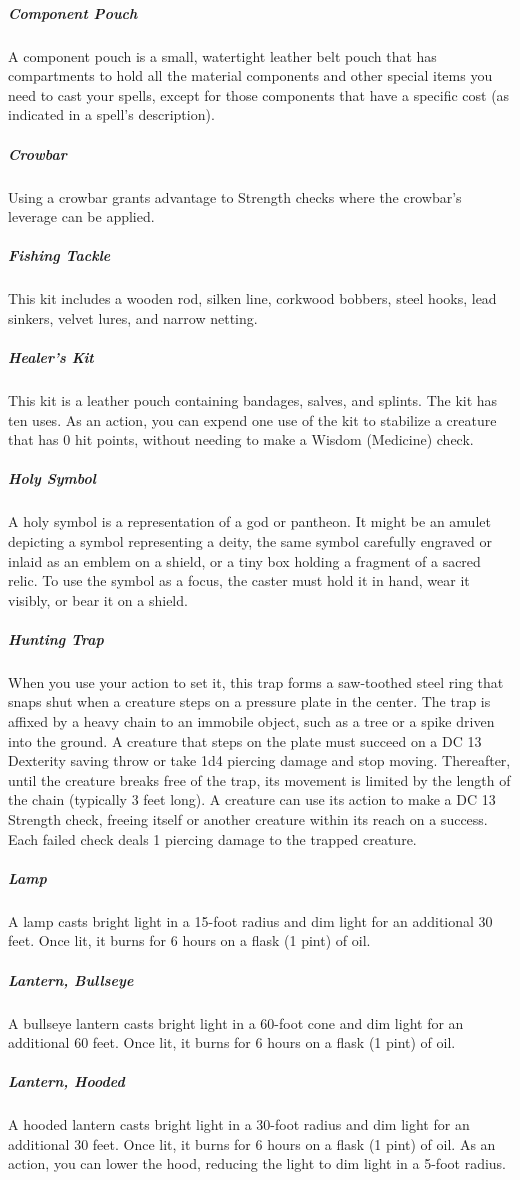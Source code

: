 \subparagraph*{Component Pouch} A component pouch is a small, watertight leather belt pouch that has compartments to hold all the material components and other special items you need to cast your spells, except for those components that have a specific cost (as indicated in a spell's description).
\subparagraph*{Crowbar} Using a crowbar grants advantage to Strength checks where the crowbar's leverage can be applied.

\subparagraph*{Fishing Tackle} This kit includes a wooden rod, silken line, corkwood bobbers, steel hooks, lead sinkers, velvet lures, and narrow netting.
\subparagraph*{Healer's Kit} This kit is a leather pouch containing bandages, salves, and splints. The kit has ten uses. As an action, you can expend one use of the kit to stabilize a creature that has 0 hit points, without needing to make a Wisdom (Medicine) check.

\subparagraph*{Holy Symbol} A holy symbol is a representation of a god or pantheon. It might be an amulet depicting a symbol representing a deity, the same symbol carefully engraved or inlaid as an emblem on a shield, or a tiny box holding a fragment of a sacred relic. To use the symbol as a focus, the caster must hold it in hand, wear it visibly, or bear it on a shield.

\subparagraph*{Hunting Trap} When you use your action to set it, this trap forms a saw-toothed steel ring that snaps shut when a creature steps on a pressure plate in the center. The trap is affixed by a heavy chain to an immobile object, such as a tree or a spike driven into the ground. A creature that steps on the plate must succeed on a DC 13 Dexterity saving throw or take 1d4 piercing damage and stop moving. Thereafter, until the creature breaks free of the trap, its movement is limited by the length of the chain (typically 3 feet long). A creature can use its action to make a DC 13 Strength check, freeing itself or another creature within its reach on a success. Each failed check deals 1 piercing damage to the trapped creature.

\subparagraph*{Lamp} A lamp casts bright light in a 15-foot radius and dim light for an additional 30 feet. Once lit, it burns for 6 hours on a flask (1 pint) of oil.
\subparagraph*{Lantern, Bullseye} A bullseye lantern casts bright light in a 60-foot cone and dim light for an additional 60 feet. Once lit, it burns for 6 hours on a flask (1 pint) of oil.
\subparagraph*{Lantern, Hooded} A hooded lantern casts bright light in a 30-foot radius and dim light for an additional 30 feet. Once lit, it burns for 6 hours on a flask (1 pint) of oil. As an action, you can lower the hood, reducing the light to dim light in a 5-foot radius.

